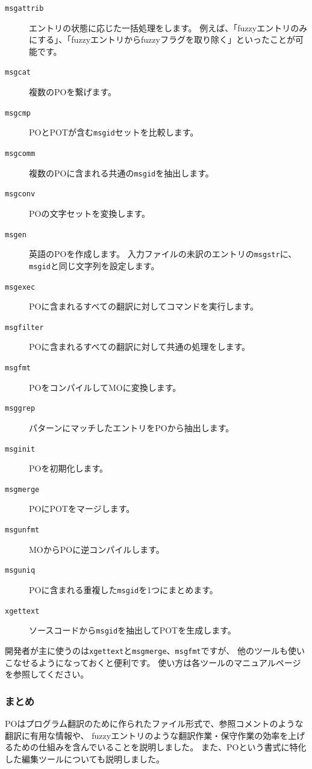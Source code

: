 \documentclass[mingoth,a4paper]{jsarticle}
\begin{document}
\begin{description}
 \item[\texttt{msgattrib}] エントリの状態に応じた一括処理をします。
	    例えば、「fuzzyエントリのみにする」、「fuzzyエントリからfuzzyフラグを取り除く」といったことが可能です。
 \item[\texttt{msgcat}] 複数のPOを繋げます。
 \item[\texttt{msgcmp}] POとPOTが含む\texttt{msgid}セットを比較します。
 \item[\texttt{msgcomm}] 複数のPOに含まれる共通の\texttt{msgid}を抽出します。
 \item[\texttt{msgconv}] POの文字セットを変換します。
 \item[\texttt{msgen}] 英語のPOを作成します。
	    入力ファイルの未訳のエントリの\texttt{msgstr}に、\texttt{msgid}と同じ文字列を設定します。
 \item[\texttt{msgexec}] POに含まれるすべての翻訳に対してコマンドを実行します。
 \item[\texttt{msgfilter}] POに含まれるすべての翻訳に対して共通の処理をします。
 \item[\texttt{msgfmt}] POをコンパイルしてMOに変換します。
 \item[\texttt{msggrep}] パターンにマッチしたエントリをPOから抽出します。
 \item[\texttt{msginit}] POを初期化します。
 \item[\texttt{msgmerge}] POにPOTをマージします。
 \item[\texttt{msgunfmt}] MOからPOに逆コンパイルします。
 \item[\texttt{msguniq}] POに含まれる重複した\texttt{msgid}を1つにまとめます。
 \item[\texttt{xgettext}] ソースコードから\texttt{msgid}を抽出してPOTを生成します。
\end{description}

開発者が主に使うのは\texttt{xgettext}と\texttt{msgmerge}、\texttt{msgfmt}ですが、
他のツールも使いこなせるようになっておくと便利です。
使い方は各ツールのマニュアルページを参照してください。

\subsubsection{まとめ}

POはプログラム翻訳のために作られたファイル形式で、参照コメントのような翻訳に有用な情報や、
fuzzyエントリのような翻訳作業・保守作業の効率を上げるための仕組みを含んでいることを説明しました。
また、POという書式に特化した編集ツールについても説明しました。
\end{document}
